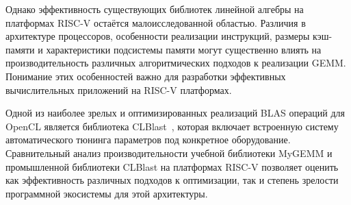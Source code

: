 Однако эффективность существующих библиотек линейной алгебры на платформах RISC-V остаётся малоисследованной областью. Различия в архитектуре процессоров, особенности реализации инструкций, размеры кэш-памяти и характеристики подсистемы памяти могут существенно влиять на производительность различных алгоритмических подходов к реализации GEMM. Понимание этих особенностей важно для разработки эффективных вычислительных приложений на RISC-V платформах.

Одной из наиболее зрелых и оптимизированных реализаций BLAS операций для OpenCL является библиотека CLBlast~\cite{clblast}, которая включает встроенную систему автоматического тюнинга параметров под конкретное оборудование. Сравнительный анализ производительности учебной библиотеки MyGEMM и промышленной библиотеки CLBlast на платформах RISC-V позволяет оценить как эффективность различных подходов к оптимизации, так и степень зрелости программной экосистемы для этой архитектуры.